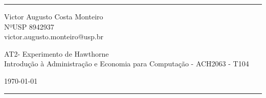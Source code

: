 \documentclass[a4paper]{article}
\begin{document}

\fancyhead[C]{}
\hrule \medskip %
\begin{minipage}{0.295\textwidth} 
    \raggedright
    \footnotesize
    Victor Augusto Costa Monteiro \hfill\\   
    NºUSP 8942937 \hfill\\
    victor.augusto.monteiro@usp.br
\end{minipage}
\begin{minipage}{0.4\textwidth} 
    \centering 
    \large 
    AT2- Experimento de Hawthorne\\ 
    \normalsize 
    Introdução à Administração e Economia para Computação - ACH2063 - T104\\ 
\end{minipage}
\begin{minipage}{0.295\textwidth} 
    \raggedleft
    \today\hfill\\
\end{minipage}
\medskip\hrule 






%
%
%
%


\printbibliography
\end{document}
